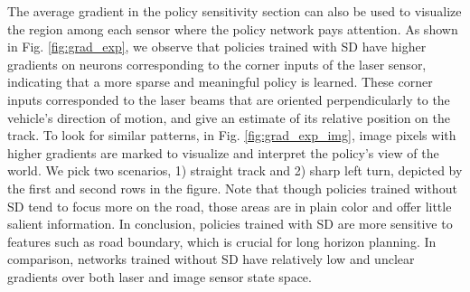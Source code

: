 \documentclass[../thesis.tex]{subfiles}
\begin{document}
The average gradient in the policy sensitivity section can also be used to visualize the region among each sensor where the policy network pays attention. As shown in Fig. \ref{fig:grad_exp}, we observe that policies trained with SD have higher gradients on neurons corresponding to the corner inputs of the laser sensor, indicating that a more sparse and meaningful policy is learned. These corner inputs corresponded to the laser beams that are oriented perpendicularly to the vehicle's direction of motion, and give an estimate of its relative position on the track. To look for similar patterns, in Fig. \ref{fig:grad_exp_img}, image pixels with higher gradients are marked to visualize and interpret the policy's view of the world. We pick two scenarios, 1) straight track and 2) sharp left turn, depicted by the first and second rows in the figure. Note that though policies trained without SD tend to focus more on the road, those areas are in plain color and offer little salient information. In conclusion, policies trained with SD are more sensitive to features such as road boundary, which is crucial for long horizon planning. In comparison, networks trained without SD have relatively low and unclear gradients over both laser and image sensor state space.
 
 
 
 
 
\end{document}
